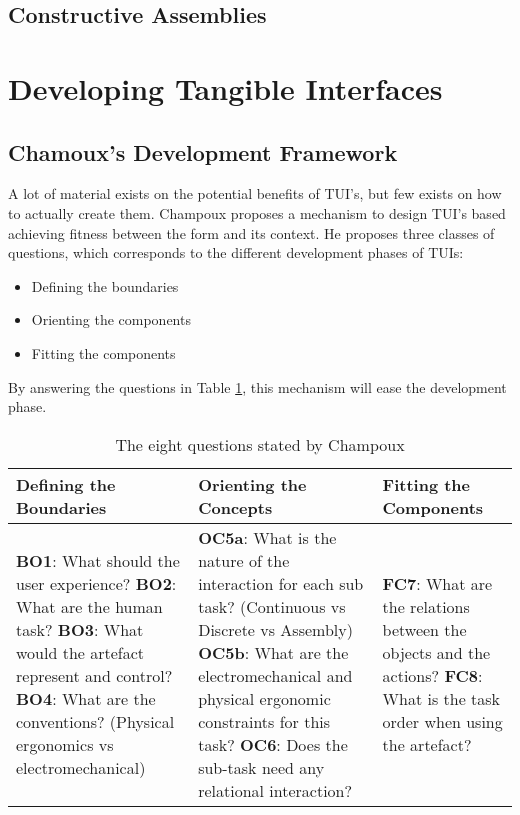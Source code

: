 \subsection{Constructive Assemblies}


\section{Developing Tangible Interfaces}

\subsection{Chamoux's Development Framework}
A lot of material exists on the potential benefits of TUI's, but few exists on how to actually create them. Champoux proposes a mechanism to design TUI's based achieving fitness between the form and its context\cite{subramaniandesign}.
He proposes three classes of questions, which corresponds to the different development phases of TUIs:
\begin{itemize}
  \item Defining the boundaries
  \item Orienting the components
  \item Fitting the components
\end{itemize} 


By answering the questions in Table \ref{tab:tuidesign}, this mechanism will ease the development phase.   


\begin{table}[h]
	\begin{tabular}{| p{5.0cm} | p{5.0cm} | p{5.0cm} |}
	\hline
	\textbf{Defining the Boundaries} & \textbf{Orienting the Concepts} & \textbf{Fitting the Components} \\
	\hline
	\textbf{BO1}: What should the user experience? \newline
	\textbf{BO2}: What are the human task? \newline
	\textbf{BO3}: What would the artefact represent and control? \newline 
	\textbf{BO4}: What are the conventions? (Physical ergonomics vs electromechanical) \newline 
	&
	\textbf{OC5a}: What is the nature of the interaction for each sub task? (Continuous vs Discrete vs Assembly) \newline
	\textbf{OC5b}: What are the electromechanical and physical ergonomic constraints for this task? \newline
	\textbf{OC6}: Does the sub-task need any relational interaction? \newline
	&
	\textbf{FC7}: What are the relations between the objects and the actions? \newline 
	\textbf{FC8}: What is the task order when using the artefact? \\ 
	\hline
	
	\end{tabular}
	\caption{The eight questions stated by Champoux\cite{subramaniandesign}}
	\label{tab:tuidesign}
\end{table}  

